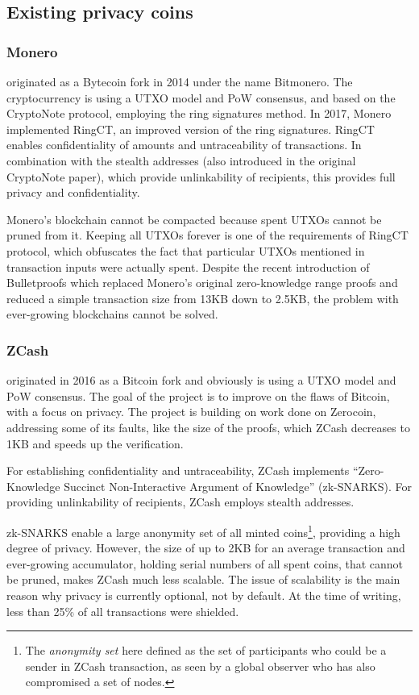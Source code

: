 \documentclass[a4paper, 10pt, conference]{ieeeconf}
\begin{document}
\subsection{Existing privacy coins}

\subsubsection{Monero} originated as a Bytecoin fork in 2014 under the name Bitmonero. The cryptocurrency is using a UTXO model and PoW consensus, and based on the CryptoNote protocol\cite{c2}, employing the ring signatures method. In 2017, Monero implemented RingCT\cite{c3}, an improved version of the ring signatures. RingCT enables confidentiality of amounts and untraceability of transactions. In combination with the stealth addresses (also introduced in the original CryptoNote paper), which provide unlinkability of recipients, this provides full privacy and confidentiality.

Monero's blockchain cannot be compacted because spent UTXOs cannot be pruned from it. Keeping all UTXOs forever is one of the requirements of RingCT protocol, which obfuscates the fact that particular UTXOs mentioned in transaction inputs were actually spent. 
Despite the recent introduction of Bulletproofs\cite{c4} which replaced Monero's original zero-knowledge range proofs and reduced a simple transaction size from 13KB down to 2.5KB, the problem with ever-growing blockchains cannot be solved. 

\subsubsection{ZCash} originated in 2016 as a Bitcoin fork and obviously is using a UTXO model and PoW consensus. The goal of the project is to improve on the flaws of Bitcoin, with a focus on privacy. The project is building on work done on Zerocoin\cite{c5}, addressing some of its faults, like the size of the proofs, which ZCash decreases to 1KB and speeds up the verification.

For establishing confidentiality and untraceability, ZCash implements ``Zero-Knowledge Succinct Non-Interactive Argument of Knowledge'' (zk-SNARKS)\cite{c6}. For providing unlinkability of recipients, ZCash employs stealth addresses.

zk-SNARKS enable a large anonymity set of all minted coins\footnote{The \textit{anonymity set} here defined as the set of participants who could be a sender in ZCash transaction, as seen by a global observer who has also compromised a set of nodes.}, providing a high degree of privacy. However, the size of up to 2KB for an average transaction and ever-growing accumulator, holding serial numbers of all spent coins, that cannot be pruned, makes ZCash much less scalable. The issue of scalability is the main reason why privacy is currently optional, not by default. At the time of writing, less than 25\% of all transactions were shielded.
\end{document}
